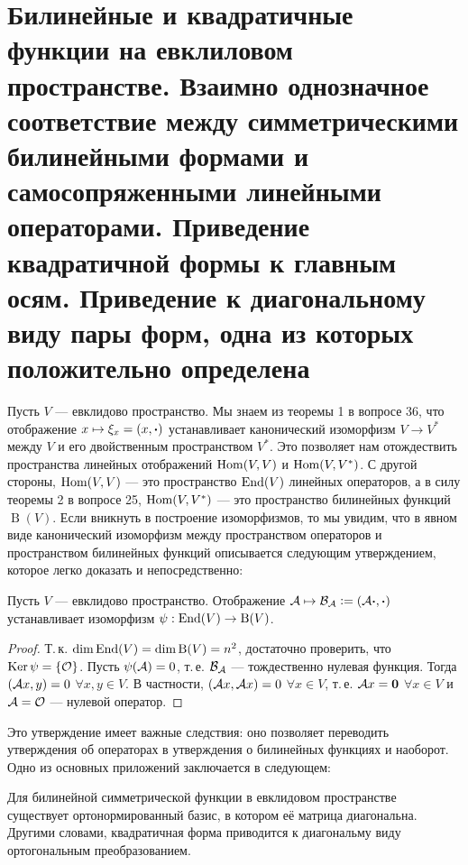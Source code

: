 \section{Билинейные и квадратичные функции на евклиловом пространстве. Взаимно однозначное
соответствие между симметрическими билинейными формами и самосопряженными
линейными операторами. Приведение квадратичной формы к главным осям. Приведение к
диагональному виду пары форм, одна из которых положительно определена}

Пусть $V$ --- евклидово пространство. Мы знаем из теоремы 1 в вопросе 36, что отображение $x \mapsto \xi_x = (x, \boldsymbol{\cdot})$ устанавливает канонический изоморфизм $V \to V^\ast$ между $V$ и его двойственным пространством $V^\ast$. Это позволяет нам отождествить пространства линейных отображений $\operatorname{Hom}(V, V)$ и $\operatorname{Hom}(V, V^\ast)$. С другой стороны, $\operatorname{Hom}(V ,V)$ --- это пространство $\operatorname{End}(V)$ линейных операторов, а в силу теоремы 2 в вопросе 25, $\operatorname{Hom}(V, V^\ast)$ --- это пространство билинейных функций $\operatorname{B}(V)$. Если вникнуть в построение изоморфизмов, то мы увидим, что в явном виде канонический изоморфизм между пространством операторов и пространством билинейных функций описывается следующим утверждением, которое легко доказать и непосредственно:

\begin{proposal}
    Пусть $V$ --- евклидово пространство. Отображение $\mathcal{A} \mapsto \mathcal{B}_{\mathcal{A}} \vcentcolon = (\mathcal{A}\boldsymbol{\cdot}, \boldsymbol{\cdot})$ устанавливает изоморфизм $\psi: \operatorname{End}(V) \to \operatorname{B}(V)$.
\end{proposal}

\begin{proof}
    Т.\,к. $\dim\operatorname{End}(V) = \dim\operatorname{B}(V) = n^2$, достаточно проверить, что $\operatorname{Ker}\psi = \{\mathcal{O}\}$. Пусть $\psi(\mathcal{A}) = 0$, т.\,е. $\mathcal{B}_{\mathcal{A}}$ --- тождественно нулевая функция. Тогда $(\mathcal{A} x, y) = 0$ $\forall x, y \in V$. В частности, $(\mathcal{A} x, \mathcal{A} x) = 0$ $\forall x \in V$, т.\,е. $\mathcal{A} x = \boldsymbol{0}$ $\forall x \in V$ и $\mathcal{A} = \mathcal{O}$ --- нулевой оператор.
\end{proof}

Это утверждение имеет важные следствия: оно позволяет переводить утверждения об операторах в утверждения о билинейных функциях и наоборот. Одно из основных приложений заключается в следующем:

\begin{theorem}
    Для билинейной симметрической функции в евклидовом пространстве существует ортонормированный базис, в котором её матрица диагональна. Другими словами, квадратичная форма приводится к диагональму виду ортогональным преобразованием.
\end{theorem}

